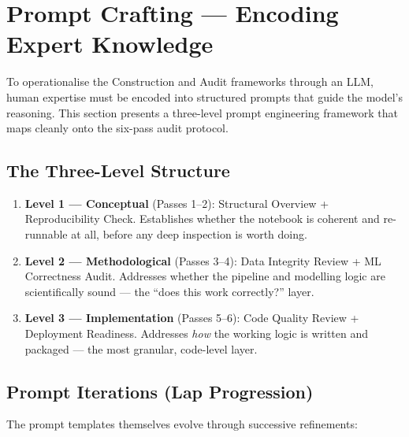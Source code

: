 \documentclass[11pt, a4paper]{article}
\begin{document}
\section{Prompt Crafting --- Encoding Expert Knowledge}
\label{sec:prompt-crafting}

To operationalise the Construction and Audit frameworks through an LLM, human
expertise must be encoded into structured prompts that guide the model's
reasoning. This section presents a three-level prompt engineering framework
that maps cleanly onto the six-pass audit protocol.

\subsection*{The Three-Level Structure}

\begin{enumerate}
  \item \textbf{Level 1 — Conceptual} (Passes 1--2): Structural Overview +
    Reproducibility Check. Establishes whether the notebook is coherent and
    re-runnable at all, before any deep inspection is worth doing.

  \item \textbf{Level 2 — Methodological} (Passes 3--4): Data Integrity
    Review + ML Correctness Audit. Addresses whether the pipeline and
    modelling logic are scientifically sound — the ``does this work
    correctly?'' layer.

  \item \textbf{Level 3 — Implementation} (Passes 5--6): Code Quality Review +
    Deployment Readiness. Addresses \textit{how} the working logic is written
    and packaged — the most granular, code-level layer.
\end{enumerate}

\subsection*{Prompt Iterations (Lap Progression)}

The prompt templates themselves evolve through successive refinements:
\end{document}
